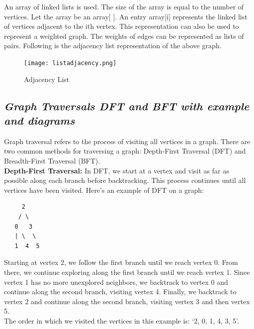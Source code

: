\documentclass{article}
\begin{document}
An array of linked lists is used. The size of the array is equal to the number of vertices. Let the array be an array[ ]. An entry array[i] represents the linked list of vertices adjacent to the ith vertex. This representation can also be used to represent a weighted graph. The weights of edges can be represented as lists of pairs. Following is the adjacency list representation of the above graph.
\begin{figure}[h]
    \centering
    \texttt{[image: listadjacency.png]}
    \caption{Adjacency List}
\end{figure}
\subsection{\textit{Graph Traversals DFT and BFT with example and diagrams}}
Graph traversal refers to the process of visiting all vertices in a graph. There are two common methods for traversing a graph: Depth-First Traversal (DFT) and Breadth-First Traversal (BFT).\\

\textbf{Depth-First Traversal:} In DFT, we start at a vertex and visit as far as possible along each branch before backtracking. This process continues until all vertices have been visited. Here's an example of DFT on a graph:
\begin{lstlisting}
     2
    / \
   0   3
   | \  \
   1  4  5

\end{lstlisting}
\pagebreak
Starting at vertex 2, we follow the first branch until we reach vertex 0. From there, we continue exploring along the first branch until we reach vertex 1. Since vertex 1 has no more unexplored neighbors, we backtrack to vertex 0 and continue along the second branch, visiting vertex 4. Finally, we backtrack to vertex 2 and continue along the second branch, visiting vertex 3 and then vertex 5.\\

The order in which we visited the vertices in this example is: `2, 0, 1, 4, 3, 5'.\\
\end{document}
